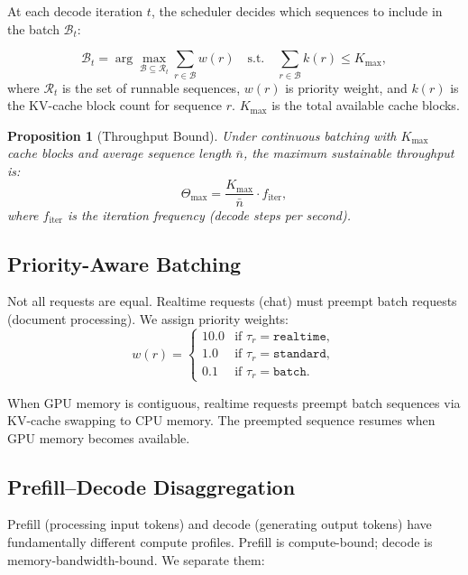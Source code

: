 \documentclass[11pt]{article}
\newtheorem{proposition}[theorem]{Proposition}
\begin{document}
At each decode iteration $t$, the scheduler decides which sequences to include
in the batch $\mathcal{B}_t$:

\begin{equation}
\mathcal{B}_t = \arg\max_{\mathcal{B} \subseteq \mathcal{R}_t}
\sum_{r \in \mathcal{B}} w(r) \quad \text{s.t.} \quad
\sum_{r \in \mathcal{B}} k(r) \leq K_{\max},
\label{eq:batch}
\end{equation}
where $\mathcal{R}_t$ is the set of runnable sequences, $w(r)$ is priority
weight, and $k(r)$ is the KV-cache block count for sequence $r$.
$K_{\max}$ is the total available cache blocks.

\begin{proposition}[Throughput Bound]
Under continuous batching with $K_{\max}$ cache blocks and average sequence
length $\bar{n}$, the maximum sustainable throughput is:
\begin{equation}
\Theta_{\max} = \frac{K_{\max}}{\bar{n}} \cdot f_{\text{iter}},
\end{equation}
where $f_{\text{iter}}$ is the iteration frequency (decode steps per second).
\end{proposition}

\subsection{Priority-Aware Batching}

Not all requests are equal. Realtime requests (chat) must preempt batch
requests (document processing). We assign priority weights:
\begin{equation}
w(r) = \begin{cases}
    10.0 & \text{if } \tau_r = \texttt{realtime}, \\
    1.0 & \text{if } \tau_r = \texttt{standard}, \\
    0.1 & \text{if } \tau_r = \texttt{batch}.
\end{cases}
\end{equation}

When GPU memory is contiguous, realtime requests preempt batch sequences via
KV-cache swapping to CPU memory. The preempted sequence resumes when GPU memory
becomes available.

\subsection{Prefill--Decode Disaggregation}

Prefill (processing input tokens) and decode (generating output tokens) have
fundamentally different compute profiles. Prefill is compute-bound; decode is
memory-bandwidth-bound. We separate them:
\end{document}
